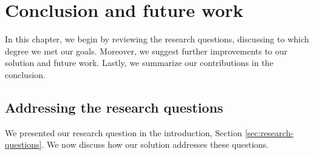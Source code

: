 \chapter{Conclusion and future work}

In this chapter, we begin by reviewing the research questions, discussing to which degree we met our goals. Moreover, we suggest further improvements to our solution and future work. Lastly, we summarize our contributions in the conclusion.

\section{Addressing the research questions}
We presented our research question in the introduction, Section \vref{sec:research-questions}. We now discuss how our solution addresses these questions.

